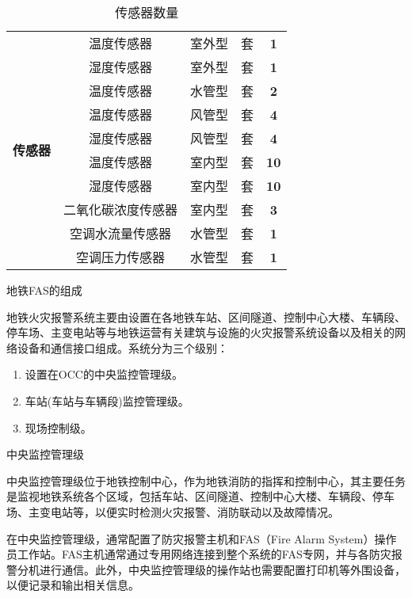 \begin{table}[h]
	\centering
	\caption{传感器数量}
	\renewcommand\arraystretch{2}
	\label{tab:传感器数量}
	\begin{tabular}{|c|c|c|c|c|}
		\hline
		\multirow{10}{*}{\textbf{传感器}} & 温度传感器     & 室外型 & 套 & \textbf{1}  \\ \cline{2-5} 
		& 湿度传感器     & 室外型 & 套 & \textbf{1}  \\ \cline{2-5} 
		& 温度传感器     & 水管型 & 套 & \textbf{2}  \\ \cline{2-5} 
		& 温度传感器     & 风管型 & 套 & \textbf{4}  \\ \cline{2-5} 
		& 湿度传感器     & 风管型 & 套 & \textbf{4}  \\ \cline{2-5} 
		& 温度传感器     & 室内型 & 套 & \textbf{10} \\ \cline{2-5} 
		& 湿度传感器     & 室内型 & 套 & \textbf{10} \\ \cline{2-5} 
		& 二氧化碳浓度传感器 & 室内型 & 套 & \textbf{3}  \\ \cline{2-5} 
		& 空调水流量传感器  & 水管型 & 套 & \textbf{1}  \\ \cline{2-5} 
		& 空调压力传感器   & 水管型 & 套 & \textbf{1}  \\ \hline
	\end{tabular}
\end{table}

地铁FAS的组成

地铁火灾报警系统主要由设置在各地铁车站、区间隧道、控制中心大楼、车辆段、停车场、主变电站等与地铁运营有关建筑与设施的火灾报警系统设备以及相关的网络设备和通信接口组成。系统分为三个级别：
\begin{enumerate}
	\item 设置在OCC的中央监控管理级。
	\item 车站(车站与车辆段)监控管理级。
	\item 现场控制级。
\end{enumerate}

中央监控管理级

中央监控管理级位于地铁控制中心，作为地铁消防的指挥和控制中心，其主要任务是监视地铁系统各个区域，包括车站、区间隧道、控制中心大楼、车辆段、停车场、主变电站等，以便实时检测火灾报警、消防联动以及故障情况。

在中央监控管理级，通常配置了防灾报警主机和FAS（Fire Alarm System）操作员工作站。FAS主机通常通过专用网络连接到整个系统的FAS专网，并与各防灾报警分机进行通信。此外，中央监控管理级的操作站也需要配置打印机等外围设备，以便记录和输出相关信息。

